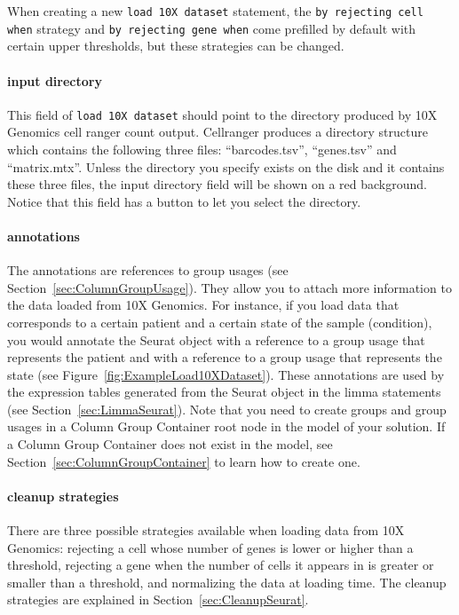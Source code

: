 When creating a new \texttt{load 10X dataset} statement, the \texttt{by rejecting cell when}
strategy and \texttt{by rejecting gene when} come prefilled by default with certain upper
thresholds, but these strategies can be changed.

\paragraph{input directory} This field of \texttt{load 10X dataset} should point to
the directory produced by 10X Genomics cell ranger count output. Cellranger produces a directory structure which contains the following three files: ``barcodes.tsv'',
``genes.tsv'' and ``matrix.mtx''. Unless the directory you specify exists on the disk and it contains
these three files, the input directory field will be shown on a red background. Notice that
this field has a button to let you select the directory.

\paragraph{annotations} The annotations are references to group usages (see
Section~\ref{sec:ColumnGroupUsage}). They allow you to attach more information to
the data loaded from 10X Genomics. For instance, if you load data that corresponds
to a certain patient and a certain state of the sample (condition),
you would annotate the Seurat object with a reference to a group usage that represents the
patient and with a reference to a group usage that represents the state (see
Figure~\ref{fig:ExampleLoad10XDataset}).
These annotations are used by the expression tables generated from the Seurat object
in the limma statements (see Section~\ref{sec:LimmaSeurat}). Note that you
need to create groups and group usages in a Column Group Container root node
in the model of your solution. If a Column Group Container does not exist in
the model, see Section~\ref{sec:ColumnGroupContainer} to learn how to create one.

\paragraph{cleanup strategies}
There are three possible strategies available when loading data from 10X Genomics: rejecting
a cell whose number of genes is lower or higher than a threshold, rejecting a
gene when the number of cells it appears in is greater or smaller than a threshold, and
normalizing the data at loading time. The cleanup strategies are explained in
Section~\ref{sec:CleanupSeurat}.

